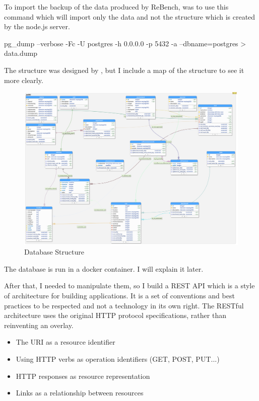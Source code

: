 \documentclass[12pt,a4paper]{article}
\begin{document}
To import the backup of the data produced by ReBench, was to use this command which will import only the data and not the structure which is created by the node.js server.

\begin{python}[h!]
pg_dump --verbose -Fc -U postgres -h 0.0.0.0 -p 5432  -a --dbname=postgres > data.dump
\end{python}

The structure was designed by \citep{ReBench:2018}, but I include a map of the structure to see it more clearly.


\begin{figure}[h!]
    \centering
    \includegraphics[width=1\textwidth]{images/database.png}
    \caption{Database Structure}
    \label{fig:database}
\end{figure}

The database is run in a docker container. I will explain it later.

After that, I needed to manipulate them, so I build a REST API which is a style of architecture for building applications. It is a set of conventions and best practices to be respected and not a technology in its own right. The RESTful architecture uses the original HTTP protocol specifications, rather than reinventing an overlay.

\begin{itemize}
    \item The URI as a resource identifier
    \item Using HTTP verbs as operation identifiers (GET, POST, PUT...)
    \item HTTP responses as resource representation
    \item Links as a relationship between resources
\end{itemize}
\end{document}
